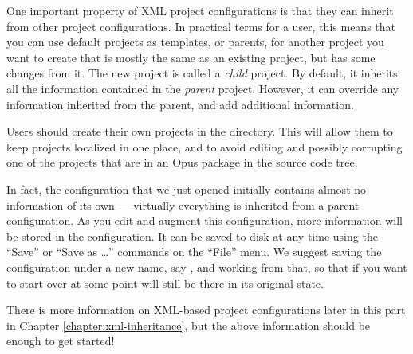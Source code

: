 One important property of XML project configurations is that they can
inherit from other project configurations.  In practical terms for a user,
this means that you can use default projects as templates, or parents, for
another project you want to create that is mostly the same as an existing
project, but has some changes from it.  The new project is called a
\emph{child} project.  By default, it inherits all the information
contained in the \emph{parent} project.  However, it can override any
information inherited from the parent, and add additional information.

Users should create their own projects in the 
directory.  This will allow them to keep projects localized in one place,
and to avoid editing and possibly corrupting one of the projects that are
in an Opus package in the source code tree.

In fact, the  configuration that we just
opened initially contains almost no information of its own --- virtually
everything is inherited from a parent configuration.  As you edit and
augment this configuration, more information will be stored in the
configuration.  It can be saved to disk at any time using the ``Save'' or
``Save as \ldots'' commands on the ``File'' menu.  We suggest saving the
configuration under a new name, say , and
working from that, so that if you want to start over at some point
 will still be there in its original state.

There is more information on XML-based project configurations later in this part
in Chapter \ref{chapter:xml-inheritance}, but the above information
should be enough to get started!

